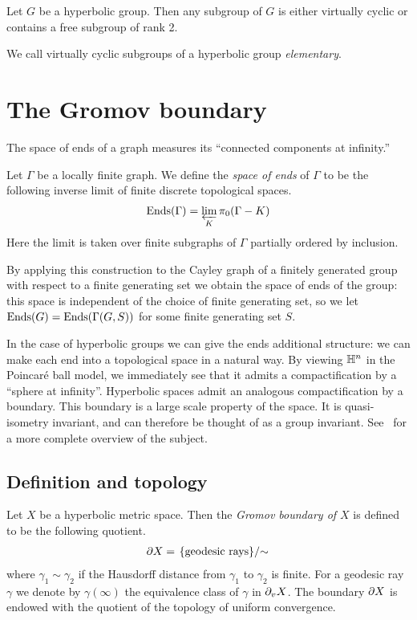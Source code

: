 \begin{theorem}\cite{gromov87}
  Let $G$ be a hyperbolic group. Then any subgroup of $G$ is either virtually cyclic or contains a free subgroup of rank 2.
\end{theorem}

We call virtually cyclic subgroups of a hyperbolic group \emph{elementary}.

\section{The Gromov boundary}\label{section:gromov_boundary}

The space of ends of a graph measures its ``connected components at infinity.''

\begin{definition}
  Let $\Gamma$ be a locally finite graph.
  We define the \emph{space of ends} of $\Gamma$ to be the following inverse limit of finite discrete topological spaces.
  \begin{align}
    \operatorname{Ends}(\Gamma) = \varprojlim_K \pi_0(\Gamma - K)
  \end{align}
  Here the limit is taken over finite subgraphs of $\Gamma$ partially ordered by inclusion.
\end{definition}

By applying this construction to the Cayley graph of a finitely generated group with respect to a finite generating set we obtain the space of ends of the group: this space is independent of the choice of finite generating set, so we let $\operatorname{Ends}(G) = \operatorname{Ends}(\operatorname{\Gamma}(G, S))$ for some finite generating set $S$.

In the case of hyperbolic groups we can give the ends additional structure: we can make each end into a topological space in a natural way.
By viewing $\mathbb{H}^n$ in the Poincar\'e ball model, we immediately see that it admits a compactification by a ``sphere at infinity''.
Hyperbolic spaces admit an analogous compactification by a boundary.
This boundary is a large scale property of the space.
It is quasi-isometry invariant, and can therefore be thought of as a group invariant.
See~\cite{kapovichbenakli02} for a more complete overview of the subject.

\subsection{Definition and topology}

\begin{definition}\cite{gromov87}\label{definition:gromov_boundary} 
  Let $X$ be a hyperbolic metric space.
  Then the \emph{Gromov boundary of $X$} is defined to be the following quotient.
  \begin{align}
    \partial X = \left.\{\text{\rm geodesic rays}\}\middle/\sim\right.
  \end{align}
  where $\gamma_1 \sim \gamma_2$ if the Hausdorff distance from $\gamma_1$ to $\gamma_2$ is finite.
  For a geodesic ray $\gamma$ we denote by $\gamma(\infty)$ the equivalence class of $\gamma$ in $\partial_vX$.
  The boundary $\partial X$ is endowed with the quotient of the topology of uniform convergence.
\end{definition}

